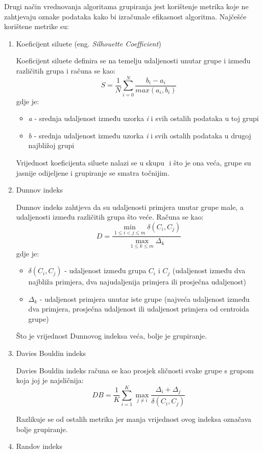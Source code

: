 \documentclass[utf8, diplomski, numeric]{fer}
\begin{document}
Drugi način vrednovanja algoritama grupiranja jest korištenje metrika koje ne zahtjevaju oznake podataka kako bi izračunale efikasnost algoritma. Najčešće korištene metrike su:

\begin{enumerate}
\item Koeficijent siluete (eng. \textit{Silhouette Coefficient})

Koeficijent siluete definira se na temelju udaljenosti unutar grupe i između različitih grupa i računa se kao:
\begin{equation*} \label{eq:silouette}
S = \frac{1}{N}\sum_{i=0}^{N}\frac{b_i-a_i}{max(a_i,b_i)} 
\end{equation*}
gdje je:
\begin{itemize}
\item \textit{a} - srednja udaljenost između uzorka \textit{i} i svih ostalih podataka u toj grupi
\item \textit{b} - srednja udaljenost između uzorka \textit{i} i svih ostalih podataka u drugoj najbližoj grupi
\end{itemize}

Vrijednost koeficijenta siluete nalazi se u skupu \begin{math}[-1,1] \end{math} i što je ona veća, grupe su jasnije odijeljene i grupiranje se smatra točnijim.

\item Dunnov indeks

Dunnov indeks zahtjeva da su udaljenosti primjera unutar grupe male, a udaljenosti između različitih grupa što veće. Računa se kao:
\begin{equation*} \label{eq:silouette}
D = \frac{\min_{1\leq i < j \leq m} \delta(C_i,C_j)}{\max_{1\leq k \leq m} \Delta_k}
\end{equation*}
gdje je:
\begin{itemize}
\item $\delta(C_i,C_j)$ - udaljenost između grupa $C_i$ i $C_j$ (udaljenost između dva najbliža primjera, dva najudaljenija primjera ili prosječna udaljenost)
\item $\Delta_k$ - udaljenost primjera unutar iste grupe (najveća udaljenost između dva primjera, prosječna udaljenost ili udaljenost primjera od centroida grupe)
\end{itemize}

Što je vrijednost Dunnovog indeksa veća, bolje je grupiranje.

\item Davies Bouldin indeks

Davies Bouldin indeks računa se kao prosjek sličnosti svake grupe s grupom koja joj je najsličnija: 
\begin{equation*} \label{eq:silouette}
DB = \frac{1}{K}\sum_{i = 1}^{K} \max_{j\neq i} \frac{\Delta_i + \Delta_j}{\delta(C_i,C_j)}
\end{equation*}

Razlikuje se od ostalih metrika jer manja vrijednost ovog indeksa označava bolje grupiranje.

\item Randov indeks

\end{enumerate}
\end{document}
